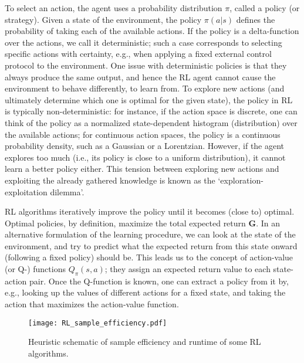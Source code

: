 To select an action, the agent uses a probability distribution $\pi$, called a policy (or strategy). Given a state of the environment, the policy $\pi(a|s)$ defines the probability of taking each of the available actions. If the policy is a delta-function over the actions, we call it deterministic; such a case corresponds to selecting specific actions with certainty, e.g., when applying a fixed external control protocol to the environment. One issue with deterministic policies is that they always produce the same output, and hence the RL agent cannot cause the environment to behave differently, to learn from. To explore new actions (and ultimately determine which one is optimal for the given state), the policy in RL is typically non-deterministic: for instance, if the action space is discrete, one can think of the policy as a normalized state-dependent histogram (distribution) over the available actions; for continuous action spaces, the policy is a continuous probability density, such as a Gaussian or a Lorentzian. However, if the agent explores too much (i.e., its policy is close to a uniform distribution), it cannot learn a better policy either. This tension between exploring new actions and exploiting the already gathered knowledge is known as the `exploration-exploitation dilemma'. 

RL algorithms iteratively improve the policy until it becomes (close to) optimal. Optimal policies, by definition, maximize the total expected return $\mathbf{G}$. In an alternative formulation of the learning procedure, we can look at the state of the environment, and try to predict what the expected return from this state onward (following a fixed policy) should be. This leads us to the concept of action-value (or Q-) functions $Q_\pi(s,a)$; they assign an expected return value to each state-action pair. Once the Q-function is known, one can extract a policy from it by, e.g., looking up the values of different actions for a fixed state, and taking the action that maximizes the action-value function. %

\begin{figure}[h!]
\texttt{[image: RL\_sample\_efficiency.pdf]}
\caption{
Heuristic schematic of sample efficiency and runtime of some RL algorithms.
}
\label{fig:RL_sample_eff}
\end{figure}

